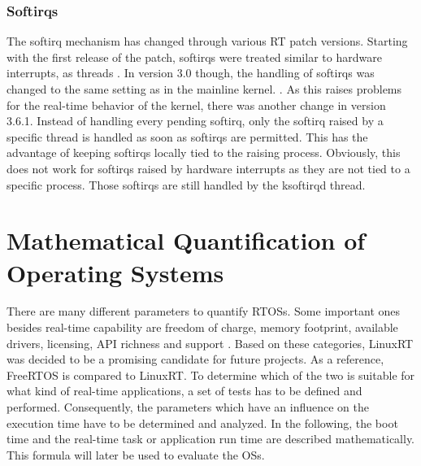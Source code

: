 \subsubsection{Softirqs}
The softirq mechanism has changed through various RT patch versions.
Starting with the first release of the patch, softirqs were treated similar to hardware interrupts, as threads \cite{rostedt:iotrtp}.
In version 3.0 though, the handling of softirqs was changed to the same setting as in the mainline kernel. \cite{corbet:siar}.
As this raises problems for the real-time behavior of the kernel, there was another change in version 3.6.1.
Instead of handling every pending softirq, only the softirq raised by a specific thread is handled as soon as softirqs are permitted. 
This has the advantage of keeping softirqs locally tied to the raising process.
Obviously, this does not work for softirqs raised by hardware interrupts as they are not tied to a specific process.
Those softirqs are still handled by the ksoftirqd thread.

\section{Mathematical Quantification of Operating Systems}
There are many different parameters to quantify \acp{RTOS}.
Some important ones besides real-time capability are freedom of charge, memory footprint, available drivers, licensing, \ac{API} richness and support \cite{Anh:sapeortosfsm}.   
Based on these categories, LinuxRT was decided to be a promising candidate for future projects.
As a reference, FreeRTOS is compared to LinuxRT.
To determine which of the two is suitable for what kind of real-time applications, a set of tests has to be defined and performed.
Consequently, the parameters which have an influence on the execution time have to be determined and analyzed.
In the following, the boot time and the real-time task or application run time are described mathematically.
This formula will later be used to evaluate the \acp{OS}.

